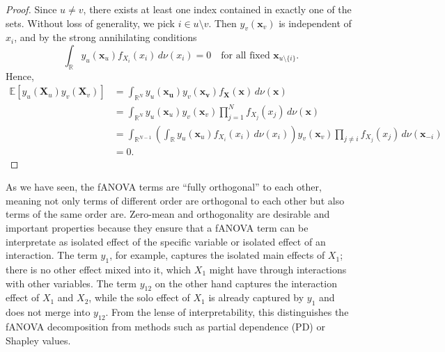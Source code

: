 \begin{proof}
Since $u \neq v$, there exists at least one index contained in exactly one of the sets. 
Without loss of generality, we pick $i \in u \setminus v$. 
Then $y_v(\boldsymbol{x}_v)$ is independent of $x_i$, and by the strong annihilating conditions
\[
    \int_{\mathbb{R}} y_u(\boldsymbol{x}_u) f_{X_i}(x_i)\,d\nu(x_i) = 0
    \quad \text{for all fixed } \boldsymbol{x}_{u\setminus \{i\}}.
\]
Hence,
\begin{align*}
    \mathbb{E}[y_u(\boldsymbol{X}_u) y_v(\boldsymbol{X}_v)] &= \int_{\mathbb{R}^{N}} y_u(\boldsymbol{x_u}) y_v(\boldsymbol{x_v}) f_{\boldsymbol{X}}(\boldsymbol{x}) \, d\nu (\boldsymbol{x}) \\
    &= \int_{\mathbb{R}^{N}} y_u(\boldsymbol{x}_u) y_v(\boldsymbol{x}_v)
       \prod_{j=1}^N f_{X_j}(x_j)\, d\nu(\boldsymbol{x}) \\
    &= \int_{\mathbb{R}^{N-1}}
        \left(\int_{\mathbb{R}} y_u(\boldsymbol{x}_u) f_{X_i}(x_i)\,d\nu(x_i)\right)
        y_v(\boldsymbol{x}_v)\prod_{j \neq i} f_{X_j}(x_j)\,d\nu(\boldsymbol{x}_{-i})\\
    &= 0.
\end{align*}
\end{proof}


As we have seen, the fANOVA terms are ``fully orthogonal'' to each other, meaning not only terms of different order are orthogonal to each other but also terms of the same order are. Zero-mean and orthogonality are desirable and important properties because they ensure that a fANOVA term can be interpretate as isolated effect of the specific variable or isolated effect of an interaction. The term $y_1$, for example, captures the isolated main effects of $X_1$; there is no other effect mixed into it, which $X_1$ might have through interactions with other variables. The term $y_{12}$ on the other hand captures the interaction effect of $X_1$ and $X_2$, while the solo effect of $X_1$ is already captured by $y_1$ and does not merge into $y_{12}$. From the lense of interpretability, this distinguishes the fANOVA decomposition from methods such as partial dependence (PD) or Shapley values.\par

